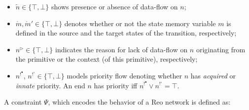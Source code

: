 \begin{itemize}
\item
 $\tilde{n} \in \{ \top, \bot \}$ shows presence or absence of data-flow on $n$;
 \item $\mathring{m}, \mathring{m}' \in \{ \top, \bot \}$ denotes whether or not the state memory variable $m$ is defined in the source and the target states of the transition, respectively; 
 \item $n^\triangleright \in \{ \top, \bot \}$ indicates the reason for lack of data-flow on $n$ originating from the primitive or the context (of this primitive), respectively;
 \item 
 $n^{!^\bullet}$, $n^{!^\circ} \in \{ \top, \bot \}$ models priority flow denoting whether $n$ has \emph{acquired} or \emph{innate} priority. An end $n$ has priority iff $n^{!^\bullet} \vee n^{!^\circ} = \top$.
\end{itemize}
 
A constraint $\Psi$, which encodes the behavior of a Reo network is defined as:


